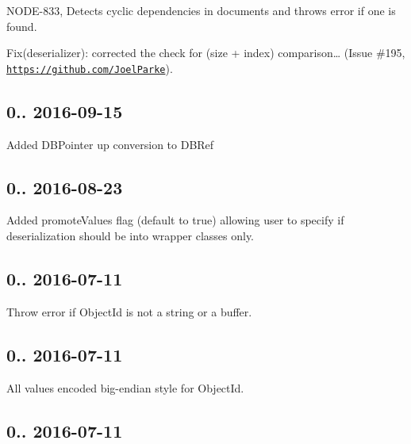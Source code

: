 \begin{DoxyItemize}
\item N\+O\+D\+E-\/833, Detects cyclic dependencies in documents and throws error if one is found.
\item Fix(deserializer)\+: corrected the check for (size + index) comparison… (Issue \#195, \href{https://github.com/JoelParke}{\tt https\+://github.\+com/\+Joel\+Parke}).
\end{DoxyItemize}

\subsection*{0.. 2016-\/09-\/15 }


\begin{DoxyItemize}
\item Added D\+B\+Pointer up conversion to D\+B\+Ref
\end{DoxyItemize}

\subsection*{0.. 2016-\/08-\/23 }


\begin{DoxyItemize}
\item Added promote\+Values flag (default to true) allowing user to specify if deserialization should be into wrapper classes only.
\end{DoxyItemize}

\subsection*{0.. 2016-\/07-\/11 }


\begin{DoxyItemize}
\item Throw error if Object\+Id is not a string or a buffer.
\end{DoxyItemize}

\subsection*{0.. 2016-\/07-\/11 }


\begin{DoxyItemize}
\item All values encoded big-\/endian style for Object\+Id.
\end{DoxyItemize}

\subsection*{0.. 2016-\/07-\/11 }


